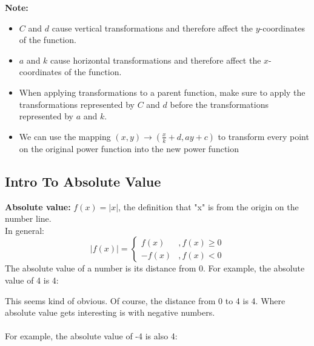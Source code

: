 \documentclass{article}
\begin{document}
\textbf{Note:}
\begin{itemize}
    \item $C$ and $d$ cause vertical transformations and therefore affect the $y$-coordinates of the function.
    \item $a$ and $k$ cause horizontal transformations and therefore affect the $x$-coordinates of the function.
    \item When applying transformations to a parent function, make sure to apply the transformations represented by $C$ and $d$ before the transformations represented by $a$ and $k$.
    \item We can use the mapping $(x,y) \to \left( \frac{x}{k}+d, ay+c\right)$ to transform every point on the original power function into the new power function
\end{itemize}
\newpage
\subsection*{Intro To Absolute Value}
\textbf{Absolute value:} $f(x)= |x|$, the definition that "x" is from the origin on the number line. \\ 
In general:\\
$$
|f(x)|=
\begin{cases}
f(x) &, f(x) \ge 0\\
-f(x) &, f(x) < 0
\end{cases}
$$
The absolute value of a number is its distance from 0. For example, the absolute value of 4 is 4:
\begin{center}
\end{center}

This seems kind of obvious. Of course, the distance from 0 to 4 is 4. Where absolute value gets interesting is with negative numbers. \\ \\
For example, the absolute value of -4 is also 4:
\begin{center}
    
\end{center}
\end{document}
